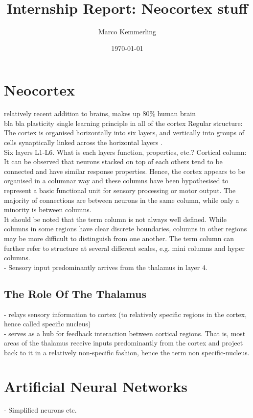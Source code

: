 \documentclass{article}
\title{Internship Report: Neocortex stuff}
\author{Marco Kemmerling}
\date{\today}
\begin{document}
\maketitle


\section{Neocortex} 
relatively recent addition to brains, makes up 80\% human brain \\
bla bla plasticity single learning principle in all of the cortex \newline \newline
Regular structure: The cortex is organised horizontally into six layers, and vertically into groups of cells synaptically linked across the horizontal layers \cite{Mountcastle1997}. \\ Six layers L1-L6. What is each layers function, properties, etc.? \newline \newline
Cortical column: It can be observed that neurons stacked on top of each others tend to be connected and have similar response properties. Hence, the cortex appears to be organised in a columnar way and these columns have been hypothesised to represent a basic functional unit for sensory processing or motor output. The majority of connections are between neurons in the same column, while only a minority is between columns.  \cite{goodhill2002cortical} \\ 
It should be noted that the term column is not always well defined. While columns in some regions have clear discrete boundaries, columns in other regions may be more difficult to distinguish from one another. The term column can further refer to structure at several different scales, e.g. mini columns and hyper columns.  \\ 
- Sensory input predominantly arrives from the thalamus in layer 4. \\ 

\subsection{The Role Of The Thalamus}
- relays sensory information to cortex (to relatively specific regions in the cortex, hence called specific nucleus) \\ 
- serves as a hub for feedback interaction between cortical regions. That is, most areas of the thalamus receive inputs predominantly from the cortex and project back to it in a relatively non-specific fashion, hence the term non specific-nucleus. 

\section{Artificial Neural Networks} 
- Simplified neurons etc. \\ 

\newpage




\end{document}

